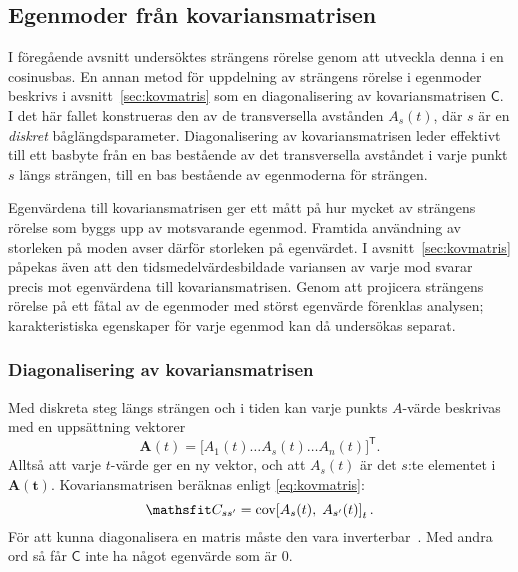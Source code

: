 \subsection{Egenmoder från kovariansmatrisen}

I föregående avsnitt undersöktes strängens rörelse genom att utveckla denna i en cosinusbas. En annan metod för uppdelning av strängens rörelse i egenmoder beskrivs i avsnitt~\ref{sec:kovmatris} som en diagonalisering av kovariansmatrisen $\mathsf{C}$. I det här fallet konstrueras den av de transversella avstånden $A_s(t)$, där $s$ är en \emph{diskret} båglängdsparameter. Diagonalisering av kovariansmatrisen leder effektivt till ett basbyte från en bas bestående av det transversella avståndet i varje punkt $s$ längs strängen, till en bas bestående av egenmoderna för strängen. 

Egenvärdena till kovariansmatrisen ger ett mått på hur mycket av strängens rörelse som byggs upp av motsvarande egenmod. Framtida användning av storleken på moden avser därför storleken på egenvärdet. I avsnitt~\ref{sec:kovmatris} påpekas även att den tidsmedelvärdesbildade variansen av varje mod svarar precis mot egenvärdena till kovariansmatrisen. Genom att projicera strängens rörelse på ett fåtal av de egenmoder med störst egenvärde förenklas analysen\cite{Shlens_PCA2014}; karakteristiska egenskaper för varje egenmod kan då undersökas separat. 

\subsubsection{Diagonalisering av kovariansmatrisen}
Med diskreta steg längs strängen och i tiden kan varje punkts $A$-värde beskrivas med en uppsättning vektorer
\begin{equation}
\mathbf{A}(t) 
= \Big[
A_1(t) \ldots A_s(t) \ldots A_n(t)
\Big]^\mathsf{T}.
\end{equation}
Alltså att varje $t$-värde ger en ny vektor, och att $A_s(t)$ är det $s$:te elementet i $\mathbf{A(t)}$. 
Kovariansmatrisen beräknas enligt \eqref{eq:kovmatris}:
\begin{equation} 
\label{eq:C}
    \mathsf{C}_{s s'} = \COV{A_s(t)}{A_{s'}(t)}_t.
\end{equation}
För att kunna diagonalisera en matris måste den vara inverterbar~\cite{Gustafsson_LaNa}. Med andra ord så får $\mathsf{C}$ inte ha något egenvärde som är $0$. 

